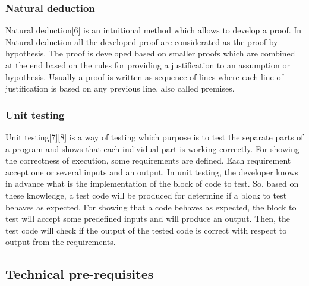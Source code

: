 \documentclass[conference,compsoc]{IEEEtran}
\begin{document}
\subsubsection{Natural deduction}
Natural deduction[6] is an intuitional method which allows to develop a proof. In Natural deduction all the developed proof are considerated as the proof by hypothesis. 
\newline
The proof is developed based on smaller proofs which are combined at the end based on the rules for providing a justification to an assumption or hypothesis. Usually a proof is written as sequence of lines where each line of justification is based on any previous line, also called premises. 

\subsubsection{Unit testing}
Unit testing[7][8] is a way of testing which purpose is to test the separate parts of a program and shows that each individual part is working correctly.
\newline
For showing the correctness of execution, some requirements are defined. Each requirement accept one or several inputs and an output. 
\newline
In unit testing, the developer knows in advance what is the implementation of the block of code to test. So, based on these knowledge, a test code will be produced for determine if a block to test behaves as expected.
\newline
For showing that a code behaves as expected, the block to test will accept some predefined inputs and will produce an output. Then, the test code will check if the output of the tested code is correct with respect to output from the requirements.   

\subsection{Technical pre-requisites}
\end{document}

